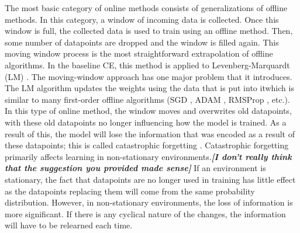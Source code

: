 	\par The most basic category of online methods consists of generalizations of offline methods. In this category, a window of incoming data is collected. Once this window is full, the collected data is used to train using an offline method. Then, some number of datapoints are dropped and the window is filled again. This moving window process is the most straightforward extrapolation of offline algorithms. In the baseline CE, this method is applied to Levenberg-Marquardt (LM) \cite{placeholderCitation}. The moving-window approach has one major problem that it introduces. The LM algorithm updates the weights using the data that is put into itwhich is similar to many first-order offline algorithms (SGD \cite{placeholderCitation}, ADAM \cite{placeholderCitation}, RMSProp \cite{placeholderCitation}, etc.). In this type of online method, the window moves and overwrites old datapoints, with these old datapoints no longer influencing how the model is trained. As a result of this, the model will lose the information that was encoded as a result of these datapoints; this is called catastrophic forgetting \cite{placeholderCitation}.  Catastrophic forgetting primarily affects learning in non-stationary environments.\textbf{\textit{[I don't really think that the suggestion you provided made sense]}} If an environment is stationary, the fact that datapoints are no longer used in training has little effect as the datapoints replacing them will come from the same probability distribution. However, in non-stationary environments, the loss of information is more significant. If there is any cyclical nature of the changes, the information will have to be relearned each time.
